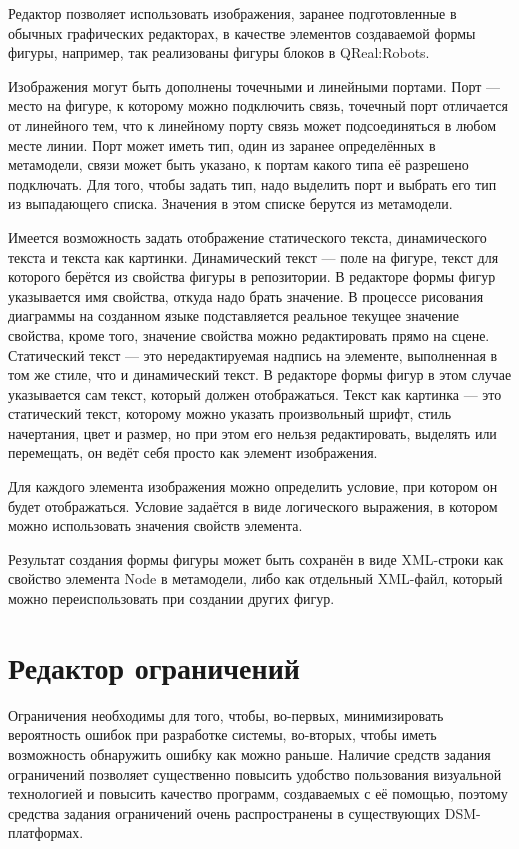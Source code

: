 Редактор позволяет использовать изображения, заранее подготовленные в обычных графических 
редакторах, в качестве элементов создаваемой формы фигуры, например, так реализованы 
фигуры блоков в QReal:Robots. 

Изображения могут быть дополнены точечными и линейными портами. Порт --- место на 
фигуре, к которому можно подключить связь, точечный порт отличается от линейного тем, 
что к линейному порту связь может подсоединяться в любом месте линии. Порт может иметь 
тип, один из заранее определённых в метамодели, связи может быть указано, к портам 
какого типа её разрешено подключать. Для того, чтобы задать тип, надо выделить порт 
и выбрать его тип из выпадающего списка. Значения в этом списке берутся из метамодели.

Имеется возможность задать отображение статического текста, динамического текста и 
текста как картинки. Динамический текст --- поле на фигуре, текст для которого берётся 
из свойства фигуры в репозитории. В редакторе формы фигур указывается имя свойства, 
откуда надо брать значение. В процессе рисования диаграммы на созданном языке подставляется 
реальное текущее значение свойства, кроме того, значение свойства можно редактировать 
прямо на сцене. Статический текст --- это нередактируемая надпись на элементе, выполненная 
в том же стиле, что и динамический текст. В редакторе формы фигур в этом случае указывается 
сам текст, который должен отображаться. Текст как картинка --- это статический текст, 
которому можно указать произвольный шрифт, стиль начертания, цвет и размер, но при 
этом его нельзя редактировать, выделять или перемещать, он ведёт себя просто как элемент 
изображения.

Для каждого элемента изображения можно определить условие, при котором он будет отображаться. 
Условие задаётся в виде логического выражения, в котором можно использовать значения 
свойств элемента. 

Результат создания формы фигуры может быть сохранён в виде XML-строки как свойство 
элемента Node в метамодели, либо как отдельный XML-файл, который можно переиспользовать 
при создании других фигур.

\section{Редактор ограничений}
Ограничения необходимы для того, чтобы, во-первых, минимизировать вероятность ошибок 
при разработке системы, во-вторых, чтобы иметь возможность обнаружить ошибку как можно 
раньше. Наличие средств задания ограничений позволяет существенно повысить удобство 
пользования визуальной технологией и повысить качество программ, создаваемых с её помощью, 
поэтому средства задания ограничений очень распространены в существующих DSM-платформах. 


